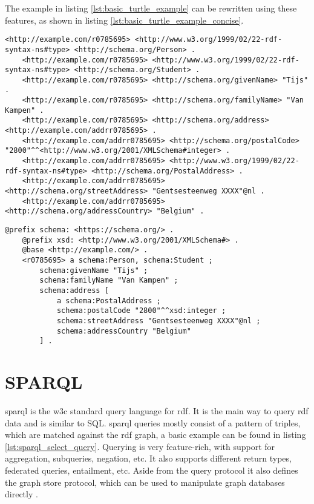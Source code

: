 The example in listing \ref{lst:basic_turtle_example} can be rewritten using these features, as shown in listing \ref{lst:basic_turtle_example_concise}.


\begin{lstlisting}[caption={Basic naive turtle document}, label={lst:basic_turtle_example}, captionpos=b, breaklines=true, basicstyle=\small]
    <http://example.com/r0785695> <http://www.w3.org/1999/02/22-rdf-syntax-ns#type> <http://schema.org/Person> .
    <http://example.com/r0785695> <http://www.w3.org/1999/02/22-rdf-syntax-ns#type> <http://schema.org/Student> .
    <http://example.com/r0785695> <http://schema.org/givenName> "Tijs" .
    <http://example.com/r0785695> <http://schema.org/familyName> "Van Kampen" .
    <http://example.com/r0785695> <http://schema.org/address> <http://example.com/addrr0785695> .
    <http://example.com/addrr0785695> <http://schema.org/postalCode> "2800"^^<http://www.w3.org/2001/XMLSchema#integer> .
    <http://example.com/addrr0785695> <http://www.w3.org/1999/02/22-rdf-syntax-ns#type> <http://schema.org/PostalAddress> .
    <http://example.com/addrr0785695> <http://schema.org/streetAddress> "Gentsesteenweg XXXX"@nl .
    <http://example.com/addrr0785695> <http://schema.org/addressCountry> "Belgium" .
\end{lstlisting}

\begin{lstlisting}[caption={Basic turtle document using turtle features}, label={lst:basic_turtle_example_concise}, captionpos=b, breaklines=true]
    @prefix schema: <https://schema.org/> .
    @prefix xsd: <http://www.w3.org/2001/XMLSchema#> .
    @base <http://example.com/> .
    <r0785695> a schema:Person, schema:Student ;
        schema:givenName "Tijs" ;
        schema:familyName "Van Kampen" ;
        schema:address [
            a schema:PostalAddress ;
            schema:postalCode "2800"^^xsd:integer ;
            schema:streetAddress "Gentsesteenweg XXXX"@nl ;
            schema:addressCountry "Belgium"
        ] .
\end{lstlisting}


\section{SPARQL}
\acrfull{sparql} is the \acrshort{w3c} standard query language for \acrshort{rdf}. It is the main way to query \acrshort{rdf} data and is similar to SQL. \acrshort{sparql} queries mostly consist of a pattern of triples, which are matched against the \acrshort{rdf} graph, a basic example can be found in listing \ref{lst:sparql_select_query}. Querying is very feature-rich, with support for aggregation, subqueries, negation, etc. It also supports different return types, federated queries, entailment, etc. \citep{SPARQL1.1QL} Aside from the query protocol it also defines the graph store protocol, which can be used to manipulate graph databases directly \citep{SPARQL1.1}. 

